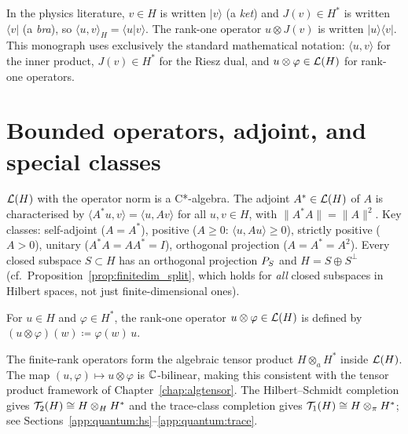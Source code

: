 \begin{remark}
\label{rem:app:dirac}
In the physics literature, $v \in H$ is written $|v\rangle$ (a
\emph{ket}) and $J(v) \in H^*$ is written $\langle v|$ (a \emph{bra}),
so $\langle u, v\rangle_H = \langle u | v\rangle$. The rank-one operator
$u \otimes J(v)$ is written $|u\rangle\langle v|$. This monograph uses
exclusively the standard mathematical notation: $\langle u, v\rangle$
for the inner product, $J(v) \in H^*$ for the Riesz dual, and
$u \otimes \varphi \in \mathcal{L}(H)$ for rank-one operators.
\end{remark}

\section{Bounded operators, adjoint, and special classes}
\label{app:quantum:bounded}

$\mathcal{L}(H)$ with the operator norm is a C*-algebra. The adjoint
$A^* \in \mathcal{L}(H)$ of $A$ is characterised by
$\langle A^*u, v\rangle = \langle u, Av\rangle$ for all $u, v \in H$,
with $\|A^*A\| = \|A\|^2$. Key classes:
self-adjoint ($A = A^*$), positive ($A \geq 0$: $\langle u, Au\rangle
\geq 0$), strictly positive ($A > 0$), unitary ($A^*A = AA^* = I$),
orthogonal projection ($A = A^* = A^2$). Every closed subspace $S
\subset H$ has an orthogonal projection $P_{S}$ and
$H = S \oplus S^\perp$ (cf.\ Proposition~\ref{prop:finitedim_split},
which holds for \emph{all} closed subspaces in Hilbert spaces, not
just finite-dimensional ones).

For $u \in H$ and $\varphi \in H^*$, the rank-one operator
$u \otimes \varphi \in \mathcal{L}(H)$ is defined by
$(u \otimes \varphi)(w) \coloneqq \varphi(w)\, u$.

\begin{remark}
\label{rem:app:rank_one_tensor}
The finite-rank operators form the algebraic tensor product
$H \otimes_a H^*$ inside $\mathcal{L}(H)$. The map $(u, \varphi) \mapsto
u \otimes \varphi$ is $\mathbb{C}$-bilinear, making this consistent with the
tensor product framework of Chapter~\ref{chap:algtensor}. The
Hilbert--Schmidt completion gives $\mathcal{T}_{2}(H) \cong H \otimes_H H^*$
and the trace-class completion gives $\mathcal{T}_{1}(H) \cong H \otimes_\pi H^*$;
see Sections~\ref{app:quantum:hs}--\ref{app:quantum:trace}.
\end{remark}

